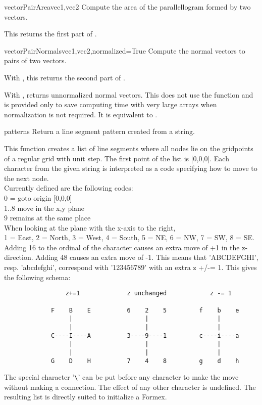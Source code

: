 {{\begin{funcdesc}{vectorPairArea}{vec1,vec2}
Compute the area of the parallellogram formed by two vectors.

This returns the first part of .
\end{funcdesc}

\begin{funcdesc}{vectorPairNormals}{vec1,vec2,normalized=True}
Compute the normal vectors to pairs of two vectors.

With , this returns the second part of .

With , returns unnormalized normal vectors. This does not use the  function and is provided only to save computing time with very large arrays when normalization is not required. It is equivalent to .

\end{funcdesc}


\begin{funcdesc}{pattern}{s}
Return a line segment pattern created from a string.

This function creates a list of line segments where all nodes lie on the gridpoints of a regular grid with unit step.
The first point of the list is [0,0,0]. Each character from the given string is interpreted as a code specifying how to move to the next node.\\
Currently defined are the following codes:\\
0 = goto origin [0,0,0]\\
1..8 move in the x,y plane\\
9 remains at the same place\\
When looking at the plane with the x-axis to the right,\\
1 = East, 2 = North, 3 = West, 4 = South, 5 = NE, 6 = NW, 7 = SW, 8 = SE.\\
Adding 16 to the ordinal of the character causes an extra move of +1 in the z-direction. Adding 48 causes an extra move of -1. This means that 'ABCDEFGHI', resp. 'abcdefghi', correspond with '123456789' with an extra z +/-= 1. This gives the following schema:
\begin{verbatim}
                 z+=1             z unchanged            z -= 1
            
             F    B    E          6    2    5         f    b    e 
                  |                    |                   |     
                  |                    |                   |     
             C----I----A          3----9----1         c----i----a  
                  |                    |                   |     
                  |                    |                   |     
             G    D    H          7    4    8         g    d    h
\end{verbatim}             
The special character '\verb?\?' can be put before any character to make the move without making a connection. The effect of any other character is undefined. The resulting list is directly suited to initialize a Formex.
\end{funcdesc}


}}
